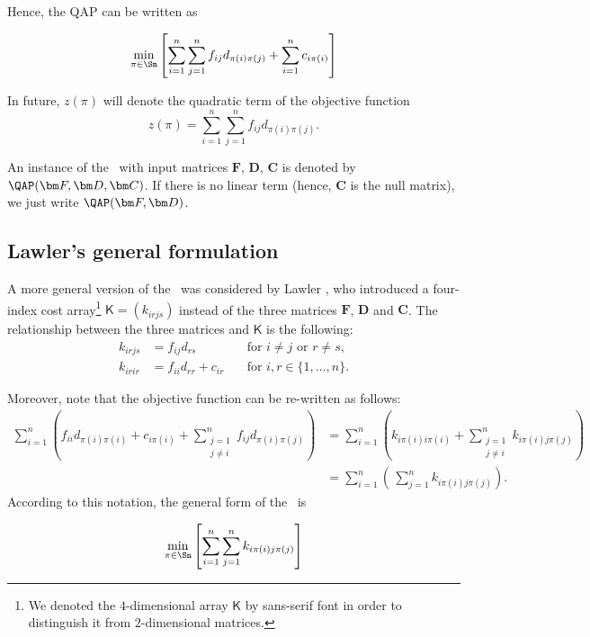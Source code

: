 Hence, the QAP can be written as 

\begin{tcolorbox}[title=Combinatorial formulation]
\begin{equation}
\label{eq:defQAP}
\min_{\pi \in \Sn}{ \left[\sum_{i=1}^n\sum_{j=1}^n f_{ij}d_{\pi(i)\pi(j)}+\sum_{i=1}^n c_{i\pi(i)}\right]}
\end{equation}
\end{tcolorbox}
In future, $z(\pi)$ will denote the quadratic term of the objective function
\begin{equation}
\label{eq:DefFunObj}
z(\pi)= \sum_{i=1}^n\sum_{j=1}^n f_{ij}d_{\pi(i)\pi(j)}.
\end{equation}

\noindent An instance of the \QAP	\ with input matrices $\bm F$, $\bm D$, $\bm C$ is denoted by $\QAP(\bm F, \bm D, \bm C)$. If there is no linear term (hence, $\bm C$ is the null matrix), we just write $\QAP(\bm F, \bm D)$.

\subsection{Lawler's general formulation}
A more general version of the \QAP \ was considered by Lawler \cite{Lawler1963}, who introduced a four-index cost array\footnote{We denoted the $4$-dimensional array $\mathsf K$ by sans-serif font in order to distinguish it from $2$-dimensional matrices.} $\mathsf K = (k_{irjs})$ instead of the three matrices $\bm F$, $\bm D$ and $\bm C$. The relationship between the three matrices and $\mathsf K$ is the following:
\begin{align}
\label{eq:defK}
k_{irjs}&=f_{ij}d_{rs} \quad &\text{for $i \neq j$ or $r \neq s$},\\
k_{irir}&=f_{ii}d_{rr} +c_{ir} \quad &\text{for $i,r\in \{1,\dots,n\}$}.
\end{align}


\noindent Moreover, note that the objective function can be re-written as follows:
\small
\[
\begin{split}
\sum_{i=1}^n
\left(
 f_{ii}d_{\pi(i)\pi(i)}
 + c_{i\pi(i)} 
 + \sum_{\substack{j=1\\j\neq i}}^n f_{ij}d_{\pi(i)\pi(j)}
 \right) 
 &= \sum_{i=1}^n
 \left(k_{i \pi(i) i \pi(i)}
 + \sum_{\substack{j=1\\j\neq i}}^n k_{i \pi(i) j \pi(j)}
 \right) \\
 &= \sum_{i=1}^n
 \left(\,\sum_{j=1}^n k_{i \pi(i) j \pi(j)}
 \right)
 .
 \end{split}
\]
\normalsize
According to this notation, the general form of the \QAP \ is
\begin{tcolorbox}[title=Lawler's general formulation]
	\begin{equation}
	\label{eq:QAPgenerale}
	\min_{\pi \in \Sn} \left[ \sum_{i=1}^n\sum_{j=1}^n k_{i \pi(i) j \pi(j)}\right]
	\end{equation}
\end{tcolorbox}



